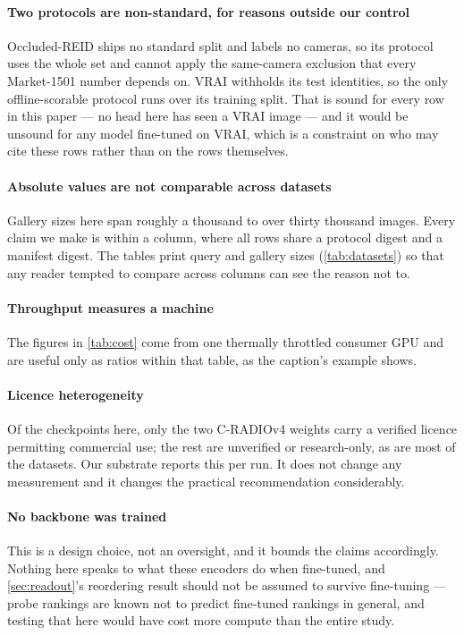 \paragraph{Two protocols are non-standard, for reasons outside our control}
Occluded-REID ships no standard split and labels no cameras, so its protocol uses the whole set
and cannot apply the same-camera exclusion that every Market-1501 number depends on. VRAI
withholds its test identities, so the only offline-scorable protocol runs over its training
split. That is sound for every row in this paper --- no head here has seen a VRAI image --- and
it would be unsound for any model fine-tuned on VRAI, which is a constraint on who may cite
these rows rather than on the rows themselves.

\paragraph{Absolute values are not comparable across datasets}
Gallery sizes here span roughly a thousand to over thirty thousand images. Every claim we make
is within a column, where all rows share a protocol digest and a manifest digest. The tables
print query and gallery sizes (\cref{tab:datasets}) so that any reader tempted to compare
across columns can see the reason not to.

\paragraph{Throughput measures a machine}
The figures in \cref{tab:cost} come from one thermally throttled consumer GPU and are useful
only as ratios within that table, as the caption's example shows.

\paragraph{Licence heterogeneity}
Of the checkpoints here, only the two C-RADIOv4 weights carry a verified licence permitting
commercial use; the rest are unverified or research-only, as are most of the datasets. Our
substrate reports this per run. It does not change any measurement and it changes the practical
recommendation considerably.

\paragraph{No backbone was trained}
This is a design choice, not an oversight, and it bounds the claims accordingly. Nothing here
speaks to what these encoders do when fine-tuned, and \cref{sec:readout}'s reordering result
should not be assumed to survive fine-tuning --- probe rankings are known not to predict
fine-tuned rankings in general, and testing that here would have cost more compute than the
entire study.
